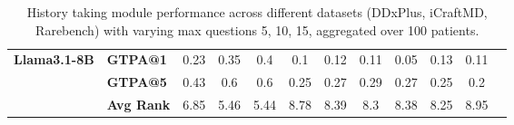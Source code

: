 \begin{table}[t]
{\begin{tabular}{llcccccccccc}
    \midrule
    \multirow{2}{*}{\textbf{Llama3.1-8B}}
    & \textbf{GTPA@1} & 0.23 & 0.35 & 0.4 & 0.1 & 0.12 & 0.11 & 0.05 & 0.13 & 0.11 \\
    & \textbf{GTPA@5} & 0.43 & 0.6 & 0.6 & 0.25 & 0.27 & 0.29 & 0.27 & 0.25 & 0.2 \\
    & \textbf{Avg Rank} & 6.85 & 5.46 & 5.44 & 8.78 & 8.39 & 8.3 & 8.38 & 8.25 & 8.95 \\
    \bottomrule
    \end{tabular}%
    }
    \caption{History taking module performance across different datasets (DDxPlus, iCraftMD, Rarebench) with varying max questions {5, 10, 15}, aggregated over 100 patients.}
    \label{tab:performance_history}
\end{table}